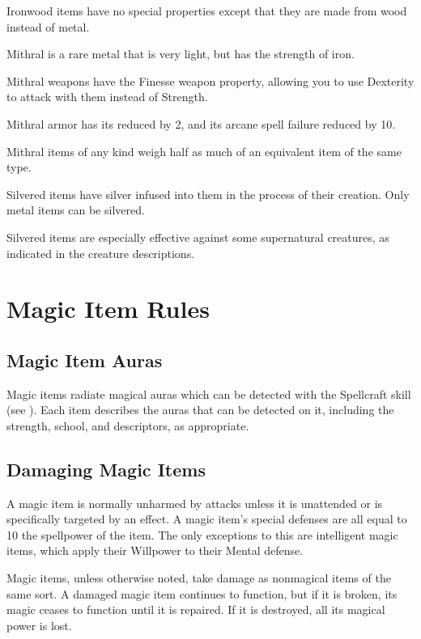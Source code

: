         Ironwood items have no special properties except that they are made from wood instead of metal.

        Mithral is a rare metal that is very light, but has the strength of iron.

        Mithral weapons have the Finesse weapon property, allowing you to use Dexterity to attack with them instead of Strength.

        Mithral armor has its  reduced by 2, and its arcane spell failure reduced by 10.

        Mithral items of any kind weigh half as much of an equivalent item of the same type.


        Silvered items have silver infused into them in the process of their creation.
        Only metal items can be silvered.

        Silvered items are especially effective against some supernatural creatures, as indicated in the creature descriptions.

\section{Magic Item Rules}

    \subsection{Magic Item Auras}

        Magic items radiate magical auras which can be detected with the Spellcraft skill (see ).
        Each item describes the auras that can be detected on it, including the strength, school, and descriptors, as appropriate.

    \subsection{Damaging Magic Items}

        A magic item is normally unharmed by attacks unless it is unattended or is specifically targeted by an effect.
        A magic item's special defenses are all equal to 10 \add the spellpower of the item.
        The only exceptions to this are intelligent magic items, which apply their Willpower to their Mental defense.

        Magic items, unless otherwise noted, take damage as nonmagical items of the same sort.
        A damaged magic item continues to function, but if it is broken, its magic ceases to function until it is repaired.
        If it is destroyed, all its magical power is lost.

